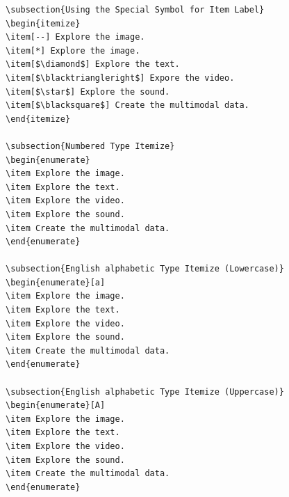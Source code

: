 \documentclass{article}
\begin{document}
\begin{lstlisting}
\subsection{Using the Special Symbol for Item Label}
\begin{itemize}
\item[--] Explore the image.
\item[*] Explore the image.
\item[$\diamond$] Explore the text.
\item[$\blacktriangleright$] Expore the video.
\item[$\star$] Explore the sound.
\item[$\blacksquare$] Create the multimodal data.
\end{itemize}

\subsection{Numbered Type Itemize}
\begin{enumerate}
\item Explore the image.
\item Explore the text.
\item Explore the video.
\item Explore the sound.
\item Create the multimodal data.
\end{enumerate}

\subsection{English alphabetic Type Itemize (Lowercase)}
\begin{enumerate}[a]
\item Explore the image.
\item Explore the text.
\item Explore the video.
\item Explore the sound.
\item Create the multimodal data.
\end{enumerate}

\subsection{English alphabetic Type Itemize (Uppercase)}
\begin{enumerate}[A]
\item Explore the image.
\item Explore the text.
\item Explore the video.
\item Explore the sound.
\item Create the multimodal data.
\end{enumerate}


\end{lstlisting}
\end{document}
